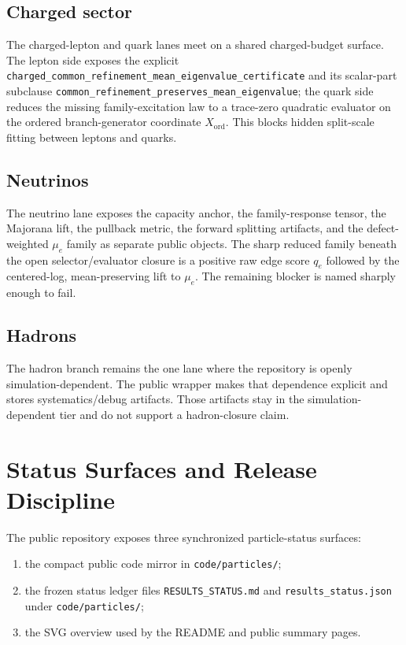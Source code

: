 \documentclass[11pt]{article}
\begin{document}
\subsection{Charged sector}

The charged-lepton and quark lanes meet on a shared charged-budget surface. The
lepton side exposes the explicit
\texttt{charged\_common\_refinement\_mean\_eigenvalue\_certificate} and its
scalar-part subclause
\texttt{common\_refinement\_preserves\_mean\_eigenvalue}; the quark side
reduces the missing family-excitation law to a trace-zero quadratic evaluator
on the ordered branch-generator coordinate \(X_{\mathrm{ord}}\). This blocks
hidden split-scale fitting between leptons and quarks.

\subsection{Neutrinos}

The neutrino lane exposes the capacity anchor, the family-response tensor, the
Majorana lift, the pullback metric, the forward splitting artifacts, and the
defect-weighted \(\mu_e\) family as separate public objects. The sharp reduced
family beneath the open selector/evaluator closure is a positive raw edge score
\(q_e\) followed by the centered-log, mean-preserving lift to \(\mu_e\). The
remaining blocker is named sharply enough to fail.

\subsection{Hadrons}

The hadron branch remains the one lane where the repository is openly
simulation-dependent. The public wrapper makes that dependence explicit and
stores systematics/debug artifacts. Those artifacts stay in the
simulation-dependent tier and do not support a hadron-closure claim.

\section{Status Surfaces and Release Discipline}

The public repository exposes three synchronized particle-status surfaces:
\begin{enumerate}[leftmargin=2em]
\item the compact public code mirror in \texttt{code/particles/};
\item the frozen status ledger files \texttt{RESULTS\_STATUS.md} and
\texttt{results\_status.json} under \texttt{code/particles/};
\item the SVG overview used by the README and public summary pages.
\end{enumerate}
\end{document}
